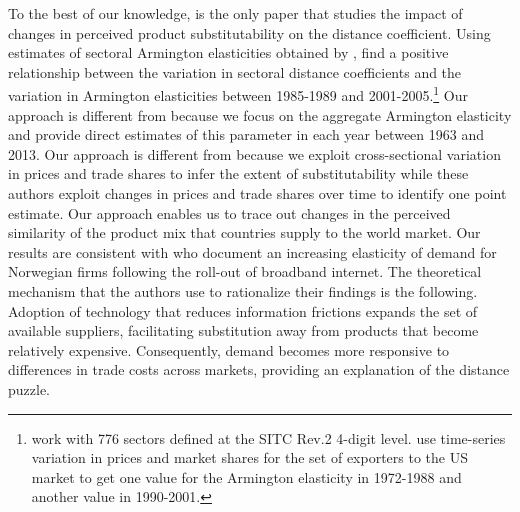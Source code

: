 \documentclass[12pt,twoside,a4paper,notitlepage]{article}
\begin{document}
To the best of our knowledge, \cite{Berthelon2008} is the only paper that studies the impact of changes in perceived product substitutability on the distance coefficient.
Using estimates of sectoral Armington elasticities obtained by \cite{Broda2006}, \cite{Berthelon2008} find a positive relationship between the variation in sectoral distance coefficients and the variation in Armington elasticities between 1985-1989 and 2001-2005.\footnote{\cite{Berthelon2008} work with 776 sectors defined at the SITC Rev.2 4-digit level.
\cite{Broda2006} use time-series variation in prices and market shares for the set of exporters to the US market to get one value for the Armington elasticity in 1972-1988 and another value in 1990-2001.}
Our approach is different from \cite{Berthelon2008} because we focus on the aggregate Armington elasticity and provide direct estimates of this parameter in each year between 1963 and 2013.
Our approach is different from \cite{Broda2006} because we exploit cross-sectional variation in prices and trade shares to infer the extent of substitutability while these authors exploit changes in prices and trade shares over time to identify one point estimate.
Our approach enables us to trace out changes in the perceived similarity of the product mix that countries supply to the world market.
Our results are consistent with \cite{Akerman2020} who document an increasing elasticity of demand for Norwegian firms following the roll-out of broadband internet. The theoretical mechanism that the authors use to rationalize their findings is the following. Adoption of technology that reduces information frictions expands the set of available suppliers, facilitating substitution away from products that become relatively expensive. Consequently, demand becomes more responsive to differences in trade costs across markets, providing an explanation of the distance puzzle.
\end{document}
